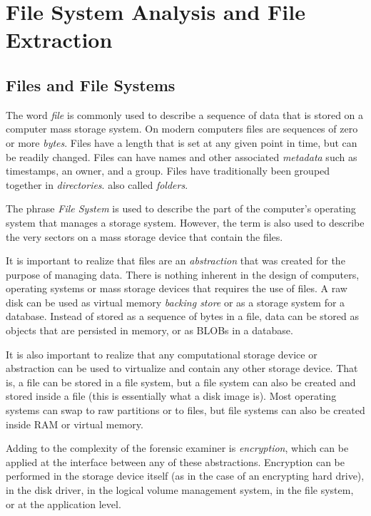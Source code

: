 \documentclass[11pt,letter]{article}
\begin{document}
\section{File System Analysis and File Extraction}


\subsection{Files and File Systems}
The word \emph{file} is commonly used to describe a sequence of data
that is stored on a computer mass storage system. On modern computers
files are sequences of zero or more \emph{bytes}. Files have a length
that is set at any given point in time, but can be readily
changed. Files can have names and other associated \emph{metadata}
such as timestamps, an owner, and a group. Files have traditionally
been grouped together in
\emph{directories}. also
called \emph{folders}. 

The phrase \emph{File
  System} is
used to describe the part of the computer's operating
system that manages a storage system. However, the term is also used
to describe the very sectors on a mass storage device that contain the
files.

It is important to realize that files are an \emph{abstraction} that
was created for the purpose of managing data. There is nothing
inherent in the design of computers, operating systems or mass storage
devices that requires the use of files. A raw disk can be used as
virtual memory \emph{backing store} or as a storage system for a
database. Instead of stored as a sequence of bytes in a file, data can be stored as
objects that are persisted in memory, or as BLOBs in a database.

It is also important to realize that any computational storage device
or abstraction can be used to virtualize and contain any other storage
device. That is, a file can be stored in a file system, but a file
system can also be created and stored inside a file (this is
essentially what a disk image is). Most operating systems can swap to raw
partitions or to files, but file systems can also be created inside
RAM or virtual memory.

Adding to the complexity of the forensic examiner is
\emph{encryption}, which can be applied at the interface between any
of these abstractions. Encryption can be performed in the storage
device itself (as in the case of an encrypting hard drive), in the
disk driver, in the logical volume management system, in the file
system, or at the application level.
\end{document}
